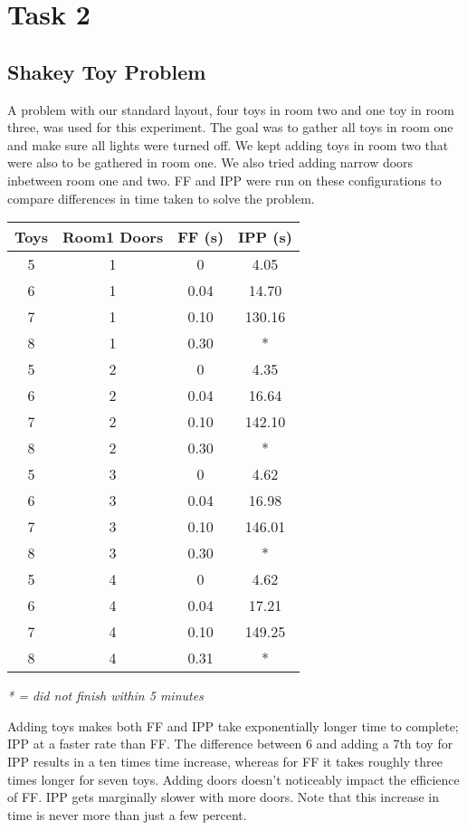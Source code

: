 
\section{Task 2}


\subsection{Shakey Toy Problem}

A problem with our standard layout, four toys in room two and one toy in room three, was used for this experiment. The goal was to gather all toys in room one and make sure all lights were turned off. We kept adding toys in room two that were also to be gathered in room one. We also tried adding narrow doors inbetween room one and two. FF and IPP were run on these configurations to compare differences in time taken to solve the problem.

\begin{tabular}{c|c|c|c}
Toys	& Room1 Doors	&FF (s) 	&IPP (s) \\\hline
5 &1&		0&	4.05\\
6	&1&		0.04&	14.70\\
7	&1&		0.10&	130.16\\
8	&1&		0.30&	*\\\hline
5	&2&		0	&4.35\\
6	&2&		0.04&	16.64\\
7	&2&		0.10&	142.10\\
8	&2&		0.30&	*\\\hline
5	&3&		0&	4.62\\
6	&3&		0.04&	16.98\\
7	&3&		0.10&	146.01\\
8	&3&		0.30&	*\\\hline
5	&4&		0&	4.62\\
6	&4&		0.04&	17.21\\
7	&4&		0.10&	149.25\\
8	&4&		0.31&	*\\\hline
\end{tabular}

\emph{* = did not finish within 5 minutes}

Adding toys makes both FF and IPP take exponentially longer time to complete; IPP at a faster rate than FF. The difference between 6 and adding a 7th toy for IPP results in a ten times time increase, whereas for FF it takes roughly three times longer for seven toys. Adding doors doesn't noticeably impact the efficience of FF. IPP gets marginally slower with more doors. Note that this increase in time is never more than just a few percent.
